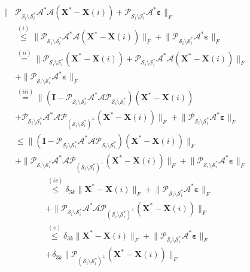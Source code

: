 \documentclass[twocolumn]{svjour3}
\newcommand{\vectornormbig}[1]{\big\|#1\big\|}
\newcommand{\sensing}{\boldsymbol{\mathcal{A}}}
\newcommand{\signal}{\boldsymbol{X}}
\newcommand{\bestsignal}{\boldsymbol{X}^\ast}
\newcommand{\noise}{\boldsymbol{\varepsilon}}
\newcommand{\id}{\mathbf{I}}
\newcommand{\rank}{k}
\begin{document}
\begin{align}
\vectornormbig{&\mathcal{P}_{\mathcal{S}_i \setminus \mathcal{S}_i^\ast} \sensing^\ast \sensing (\bestsignal - \signal(i)) + \mathcal{P}_{\mathcal{S}_i \setminus \mathcal{S}_i^\ast} \sensing^\ast \noise}_F \nonumber \\
&\stackrel{(i)}{\leq} \vectornormbig{\mathcal{P}_{\mathcal{S}_i \setminus \mathcal{S}_i^\ast} \sensing^\ast \sensing (\bestsignal - \signal(i))}_F + \vectornormbig{\mathcal{P}_{\mathcal{S}_i \setminus \mathcal{S}_i^\ast} \sensing^\ast \noise}_F \nonumber \\
&\stackrel{(ii)}{=} \vectornormbig{\mathcal{P}_{\mathcal{S}_i \setminus \mathcal{S}_i^\ast} (\bestsignal - \signal(i)) + \mathcal{P}_{\mathcal{S}_i \setminus \mathcal{S}_i^\ast} \sensing^\ast \sensing (\bestsignal - \signal(i))}_F \nonumber \\ &+ \vectornormbig{\mathcal{P}_{\mathcal{S}_i \setminus \mathcal{S}_i^\ast} \sensing^\ast \noise}_F \nonumber \\
&\stackrel{(iii)}{=} \big\|(\id - \mathcal{P}_{\mathcal{S}_i \setminus \mathcal{S}_i^\ast}\sensing^\ast \sensing \mathcal{P}_{\mathcal{S}_i \setminus \mathcal{S}_i^\ast}) (\bestsignal - \signal(i)) \nonumber \\ &+ \mathcal{P}_{\mathcal{S}_i \setminus \mathcal{S}_i^\ast} \sensing^\ast \sensing \mathcal{P}_{(\mathcal{S}_i \setminus \mathcal{S}_i^\ast)^\bot} (\bestsignal - \signal(i))\big\|_F + \vectornormbig{\mathcal{P}_{\mathcal{S}_i \setminus \mathcal{S}_i^\ast} \sensing^\ast \noise}_F \nonumber \\
&\leq \vectornormbig{(\id - \mathcal{P}_{\mathcal{S}_i \setminus \mathcal{S}_i^\ast}\sensing^\ast \sensing \mathcal{P}_{\mathcal{S}_i \setminus \mathcal{S}_i^\ast}) (\bestsignal - \signal(i))}_F \nonumber \\ &+ \vectornormbig{\mathcal{P}_{\mathcal{S}_i \setminus \mathcal{S}_i^\ast} \sensing^\ast \sensing \mathcal{P}_{(\mathcal{S}_i \setminus \mathcal{S}_i^\ast)^\bot} (\bestsignal - \signal(i))}_F + \vectornormbig{\mathcal{P}_{\mathcal{S}_i \setminus \mathcal{S}_i^\ast} \sensing^\ast \noise}_F \nonumber 
\end{align}
\begin{align}
&\stackrel{(iv)}{\leq} \delta_{3\rank}\vectornormbig{\bestsignal - \signal(i)}_F + \vectornormbig{\mathcal{P}_{\mathcal{S}_i \setminus \mathcal{S}_i^\ast} \sensing^\ast \noise}_F \nonumber \\ &+ \vectornormbig{\mathcal{P}_{\mathcal{S}_i \setminus \mathcal{S}_i^\ast} \sensing^\ast \sensing \mathcal{P}_{(\mathcal{S}_i \setminus \mathcal{S}_i^\ast)^\bot} (\bestsignal - \signal(i))}_F \nonumber \\
&\stackrel{(v)}{\leq} \delta_{3\rank}\vectornormbig{\bestsignal - \signal(i)}_F + \vectornormbig{\mathcal{P}_{\mathcal{S}_i \setminus \mathcal{S}_i^\ast} \sensing^\ast \noise}_F \nonumber \\ &+ \delta_{3\rank}\vectornormbig{\mathcal{P}_{(\mathcal{S}_i \setminus \mathcal{S}_i^\ast)^\bot} (\bestsignal - \signal(i))}_F \nonumber 
\end{align}
\end{document}
